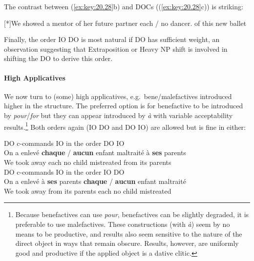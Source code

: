 \documentclass[output=paper]{langsci/langscibook}
\begin{document}
The contrast between  (\ref{ex:key:20.28}b) and 
\glspl{DOC} ((\ref{ex:key:20.28}c)) is striking:

\begin{exe}
    \exi{\eqref{ex:key:20.28}}
    \begin{xlist}
    [*]{We {} showed  a mentor of her future partner each / no dancer.\glossF{} of this new ballet}
    \end{xlist}
\end{exe}
%
Finally, the order IO DO is most natural if DO has sufficient weight, an
observation suggesting that Extraposition or Heavy NP shift is involved in
shifting the DO to derive this order.

\paragraph*{High Applicatives} We now turn to (some) high applicatives, e.g.\
bene/male\-factives introduced higher in the structure. The preferred option is
for benefactive to be introduced by \emph{pour}/\emph{for} but they can appear
introduced by \emph{à} with variable acceptability results.\footnote{Because
    benefactives can use {\it pour}, benefactives can be slightly degraded, it
    is preferable to use malefactives. These constructions (with \emph{à}) seem
    by no means to be productive, and results also seem sensitive to the nature
of the direct object in ways that remain obscure. Results, however, are
uniformly good and productive if the applied object is a dative
clitic.} Both orders again (IO DO and DO IO) are allowed but \isi{binding} is
fine in either:

\ea \label{doio25}
\ea  DO c-commands IO in the order DO IO\\
\gll On a  enlev\'{e} \textbf{chaque} / \textbf{aucun} enfant maltrait\'e \`{a} {\bf ses} parents\\
We {} {took away} each {} no child mistreated from its parents\\
\ex  DO c-commands IO in the order IO DO\\
\gll On a  enlev\'{e} \`{a} {\bf ses} parents \textbf{chaque} / \textbf{aucun} enfant maltrait\'e \\
We {} {took away}  from its parents each {} no child mistreated\\
\z
\z
\end{document}
